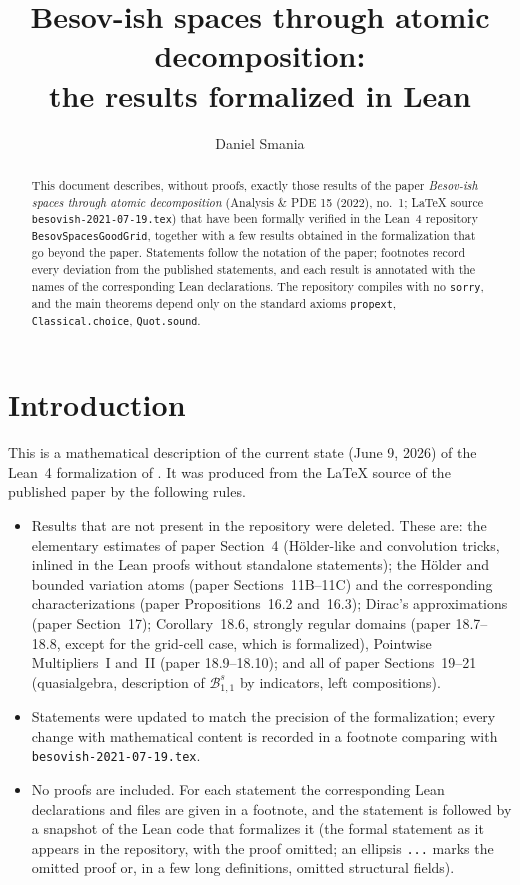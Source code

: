 \documentclass[11pt]{amsart}
\title[Besov-ish spaces: the formalized results]{Besov-ish spaces through atomic decomposition:\\ the results formalized in Lean}
\author[D. Smania]{Daniel Smania}
\theoremstyle{definition}
\newcommand{\SB}{{\mathcal B}}
\begin{document}
\begin{abstract}
This document describes, without proofs, exactly those results of the paper
\emph{Besov-ish spaces through atomic decomposition} (Analysis \& PDE 15
(2022), no.\ 1; LaTeX source \texttt{besovish-2021-07-19.tex}) that have been
formally verified in the Lean~4 repository \texttt{BesovSpacesGoodGrid},
together with a few results obtained in the formalization that go beyond the
paper. Statements follow the notation of the paper; footnotes record every
deviation from the published statements, and each result is annotated with the
names of the corresponding Lean declarations. The repository compiles with no
\texttt{sorry}, and the main theorems depend only on the standard axioms
\texttt{propext}, \texttt{Classical.choice}, \texttt{Quot.sound}.
\end{abstract}

\maketitle

\setcounter{tocdepth}{2}
\tableofcontents

\section{Introduction}

This is a mathematical description of the current state (June 9, 2026) of the
Lean~4 formalization of \cite{paper}. It was produced from the LaTeX source of
the published paper by the following rules.

\begin{itemize}
\item Results that are not present in the repository were deleted. These are:
  the elementary estimates of paper Section~4 (H\"older-like and convolution
  tricks, inlined in the Lean proofs without standalone statements); the
  H\"older and bounded variation atoms (paper Sections~11B--11C) and the
  corresponding characterizations (paper Propositions~16.2 and~16.3); Dirac's
  approximations (paper Section~17); Corollary~18.6, strongly regular domains
  (paper 18.7--18.8, except for the grid-cell case, which is formalized),
  Pointwise Multipliers~I and~II (paper 18.9--18.10); and all of paper
  Sections~19--21 (quasialgebra, description of $\SB^s_{1,1}$ by indicators,
  left compositions).
\item Statements were updated to match the precision of the formalization;
  every change with mathematical content is recorded in a footnote comparing
  with \texttt{besovish-2021-07-19.tex}.
\item No proofs are included. For each statement the corresponding Lean
  declarations and files are given in a footnote, and the statement is
  followed by a snapshot of the Lean code that formalizes it (the formal
  statement as it appears in the repository, with the proof omitted; an
  ellipsis \texttt{...} marks the omitted proof or, in a few long
  definitions, omitted structural fields).
\end{itemize}
\end{document}
